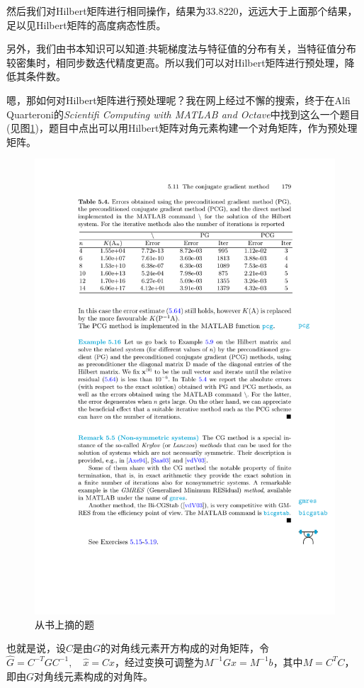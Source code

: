然后我们对Hilbert矩阵进行相同操作，结果为33.8220，远远大于上面那个结果，足以见Hilbert矩阵的高度病态性质。

另外，我们由书本知识可以知道:共轭梯度法与特征值的分布有关，当特征值分布较密集时，相同步数迭代精度更高。所以我们可以对Hilbert矩阵进行预处理，降低其条件数。

嗯，那如何对Hilbert矩阵进行预处理呢？我在网上经过不懈的搜索，终于在Alfi Quarteroni的\emph{Scientifi Computing with MATLAB and Octave}中找到这么一个题目(见图\ref{exam})，题目中点出可以用Hilbert矩阵对角元素构建一个对角矩阵，作为预处理矩阵。

\begin{figure}[H]
\centering
\includegraphics[width=12cm]{fig/5_5.pdf}
\caption{从书上摘的题}
\label{exam}
\end{figure}

也就是说，设$C$是由$G$的对角线元素开方构成的对角矩阵，令$\hat{G}=C^{-T}GC^{-1},\quad \hat{x}=Cx$，经过变换可调整为$M^{-1}Gx=M^{-1}b$，其中$M=C^TC$，即由$G$对角线元素构成的对角阵。

